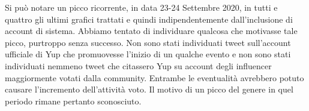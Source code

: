 Si può notare un picco ricorrente, in data 23-24 Settembre 2020, in tutti e quattro gli ultimi grafici trattati e quindi indipendentemente dall'inclusione di account di sistema. Abbiamo tentato di individuare qualcosa che motivasse tale picco, purtroppo senza successo. Non sono stati individuati tweet sull'account ufficiale di Yup che promuovesse l'inizio di un qualche evento e non sono stati individuati nemmeno tweet che citassero Yup su account degli influencer maggiormente votati dalla community. Entrambe le eventualità avrebbero potuto causare l'incremento dell'attività voto. Il motivo di un picco del genere in quel periodo rimane pertanto sconosciuto.
